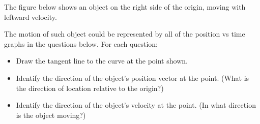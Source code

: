 \documentclass[answers]{exam}
\newcommand{\speedometer}[3]{%
    \begin{scope}[shift={#1},x=1cm,y=1cm,scale=0.8,transform shape,overlay]
        \draw (0,0) circle (1);
        \foreach \x in {340,360,...,560} {
            \coordinate (P) at ({cos(\x)},{sin(\x)});
            \draw[ultra thick,gray] (P) -- ($(P)!0.16!(0,0)$);
        }
        \foreach \x in {350,370,...,550} {
            \coordinate (P) at ({cos(\x)},{sin(\x)});
            \draw[thick,gray] (P) -- ($(P)!0.08!(0,0)$);
        }
        \fill (0,0) circle (0.02);
        \draw[fill=lightgray,rotate={#2},red!60] (0,0.02) rectangle (0.975,-0.02);
        \node at (0,0.4) {\texttt{Speed}};
        \draw[rounded corners] (-0.65,-0.75) rectangle ++(1.3,0.5) node[pos=0.5] {\textsf{#3\,m/s}};
    \end{scope}
}
\begin{document}


The figure below shows an object on the right side of the origin, moving with leftward velocity.

\begin{center}
\end{center}

\noindent The motion of such object could be represented by all of the position vs time graphs in the questions below. For each question:

\begin{itemize}[topsep=0pt,itemsep=0pt]
    \item Draw the tangent line to the curve at the point shown.
    \item Identify the direction of the object's position vector at the point. (What is the  direction of location relative to the origin?)
    \item Identify the direction of the object's velocity at the point. (In what direction is the object moving?)
\end{itemize}
\end{document}
